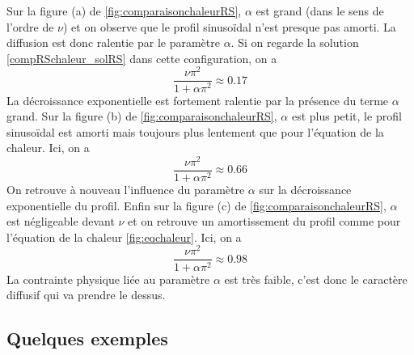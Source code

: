 Sur la figure (a) de \ref{fig:comparaisonchaleurRS}, $\alpha$ est grand (dans le sens de l'ordre de $\nu$) et on observe que le profil sinusoïdal n'est presque pas amorti. La diffusion est donc ralentie par le paramètre $\alpha$. Si on regarde la solution \eqref{compRSchaleur_solRS} dans cette configuration, on a 
\begin{equation*}
    \frac{\nu \pi^2}{1+\alpha \pi^2} \approx 0.17
\end{equation*}
La décroissance exponentielle est fortement ralentie par la présence du terme $\alpha$ grand.
Sur la figure (b) de \ref{fig:comparaisonchaleurRS}, $\alpha$ est plus petit, le profil sinusoïdal est amorti mais toujours plus lentement que pour l'équation de la chaleur. Ici, on a 
\begin{equation*}
    \frac{\nu \pi^2}{1+\alpha \pi^2} \approx 0.66
\end{equation*}
On retrouve à nouveau l'influence du paramètre $\alpha$ sur la décroissance exponentielle du profil.
Enfin sur la figure (c) de \ref{fig:comparaisonchaleurRS}, $\alpha$ est négligeable devant $\nu$ et on retrouve un amortissement du profil comme pour l'équation de la chaleur \ref{fig:eqchaleur}. Ici, on a
\begin{equation*}
    \frac{\nu \pi^2}{1+\alpha \pi^2} \approx 0.98
\end{equation*}
La contrainte physique liée au paramètre $\alpha$ est très faible, c'est donc le caractère diffusif qui va prendre le dessus.
    
\subsection{Quelques exemples}
